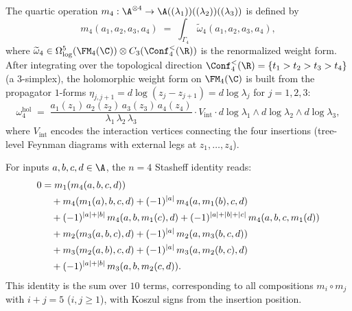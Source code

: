 \begin{construction}
The quartic operation $m_4 : \A^{\otimes 4} \to
\A((\lambda_1))((\lambda_2))((\lambda_3))$ is defined by
\[
m_4(a_1, a_2, a_3, a_4)
\;=\;
\int_{\Gamma_4}
\widetilde{\omega}_4(a_1, a_2, a_3, a_4),
\]
where $\widetilde{\omega}_4 \in
\Omega^5_{\log}(\FM_4(\C)) \otimes C_3(\Conf_4^<(\R))$
is the renormalized weight form. After integrating over the
topological direction $\Conf_4^<(\R) = \{t_1 > t_2 > t_3 > t_4\}$
(a $3$-simplex), the holomorphic weight form on $\FM_4(\C)$ is
built from the propagator $1$-forms
$\eta_{j,j+1} = d\log(z_j - z_{j+1}) = d\log\lambda_j$
for $j = 1,2,3$:
\[
\omega_4^{\mathrm{hol}}
\;=\;
\frac{a_1(z_1)\, a_2(z_2)\, a_3(z_3)\, a_4(z_4)}
{\lambda_1\, \lambda_2\, \lambda_3}
\cdot V_{\mathrm{int}}
\cdot d\log\lambda_1 \wedge d\log\lambda_2 \wedge d\log\lambda_3,
\]
where $V_{\mathrm{int}}$ encodes the interaction vertices
connecting the four insertions (tree-level Feynman diagrams with
external legs at $z_1, \ldots, z_4$).
\end{construction}

\begin{theorem}[Stasheff identity at $n = 4$; \ClaimStatusProvedHere]
For inputs $a, b, c, d \in \A$, the $n = 4$ Stasheff identity
reads:
\begin{align}
0 &= m_1(m_4(a,b,c,d)) \notag \\
&\quad + m_4(m_1(a),b,c,d)
 + (-1)^{|a|}\, m_4(a,m_1(b),c,d) \notag \\
&\quad + (-1)^{|a|+|b|}\, m_4(a,b,m_1(c),d)
 + (-1)^{|a|+|b|+|c|}\, m_4(a,b,c,m_1(d)) \notag \\
&\quad + m_2(m_3(a,b,c),d)
 + (-1)^{|a|}\, m_2(a,m_3(b,c,d)) \notag \\
&\quad + m_3(m_2(a,b),c,d)
 + (-1)^{|a|}\, m_3(a,m_2(b,c),d) \notag \\
&\quad + (-1)^{|a|+|b|}\, m_3(a,b,m_2(c,d)).
\end{align}
This identity is the sum over $10$ terms, corresponding to
all compositions $m_i \circ m_j$ with $i + j = 5$
($i,j \ge 1$), with Koszul signs from the insertion position.
\end{theorem}


